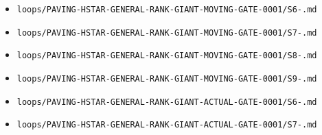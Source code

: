 \documentclass[10pt]{article}
\begin{document}
\begin{itemize}
\item \texttt{loops/\allowbreak{}PAVING-\allowbreak{}HSTAR-\allowbreak{}GENERAL-\allowbreak{}RANK-\allowbreak{}GIANT-\allowbreak{}MOVING-\allowbreak{}GATE-\allowbreak{}0001/\allowbreak{}S6-.\allowbreak{}md}
\item \texttt{loops/\allowbreak{}PAVING-\allowbreak{}HSTAR-\allowbreak{}GENERAL-\allowbreak{}RANK-\allowbreak{}GIANT-\allowbreak{}MOVING-\allowbreak{}GATE-\allowbreak{}0001/\allowbreak{}S7-.\allowbreak{}md}
\item \texttt{loops/\allowbreak{}PAVING-\allowbreak{}HSTAR-\allowbreak{}GENERAL-\allowbreak{}RANK-\allowbreak{}GIANT-\allowbreak{}MOVING-\allowbreak{}GATE-\allowbreak{}0001/\allowbreak{}S8-.\allowbreak{}md}
\item \texttt{loops/\allowbreak{}PAVING-\allowbreak{}HSTAR-\allowbreak{}GENERAL-\allowbreak{}RANK-\allowbreak{}GIANT-\allowbreak{}MOVING-\allowbreak{}GATE-\allowbreak{}0001/\allowbreak{}S9-.\allowbreak{}md}
\item \texttt{loops/\allowbreak{}PAVING-\allowbreak{}HSTAR-\allowbreak{}GENERAL-\allowbreak{}RANK-\allowbreak{}GIANT-\allowbreak{}ACTUAL-\allowbreak{}GATE-\allowbreak{}0001/\allowbreak{}S6-.\allowbreak{}md}
\item \texttt{loops/\allowbreak{}PAVING-\allowbreak{}HSTAR-\allowbreak{}GENERAL-\allowbreak{}RANK-\allowbreak{}GIANT-\allowbreak{}ACTUAL-\allowbreak{}GATE-\allowbreak{}0001/\allowbreak{}S7-.\allowbreak{}md}

\end{itemize}
\end{document}
